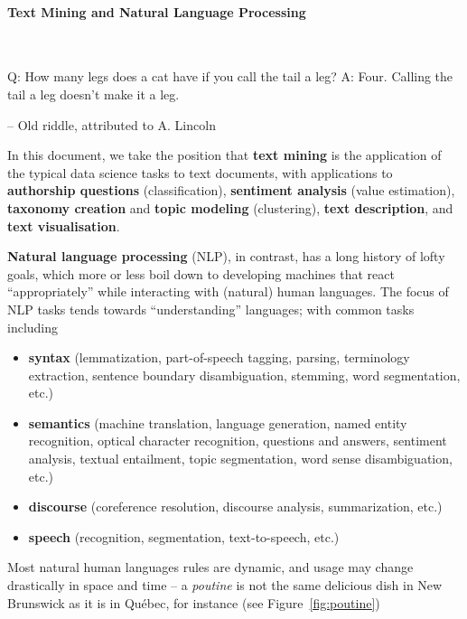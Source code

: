 \paragraph{Text Mining and Natural Language Processing}\ \newline
\begin{tcolorbox}[title=Language and Data]
Q: How many legs does a cat have if you call the tail a leg?\newline
A: Four. Calling the tail a leg doesn't make it a leg.
 \\[-0.6cm]
\begin{flushright}
-- Old riddle, attributed to A. Lincoln
\end{flushright}
\end{tcolorbox}
\noindent In this document, we take the position that \textbf{text mining} is the application of the typical data science tasks to text documents, with applications to \textbf{authorship questions} (classification), \textbf{sentiment analysis} (value estimation), \textbf{taxonomy creation} and \textbf{topic modeling} (clustering), \textbf{text description}, and \textbf{text visualisation}. \par \textbf{Natural language processing} (NLP), in contrast, has a long history of lofty goals, which more or less boil down to developing machines that react ``appropriately'' while interacting with (natural) human languages. The focus of NLP tasks tends towards ``understanding'' languages; with common tasks including 
\begin{itemize}[noitemsep]
    \item \textbf{syntax} (lemmatization, part-of-speech tagging, parsing, terminology extraction, sentence boundary disambiguation, stemming, word segmentation, etc.)
    \item \textbf{semantics} (machine translation, language generation, named entity recognition, optical character recognition, questions and answers, sentiment analysis, textual entailment, topic segmentation, word sense disambiguation, etc.)
    \item \textbf{discourse} (coreference resolution, discourse analysis, summarization, etc.)
    \item \textbf{speech} (recognition, segmentation, text-to-speech, etc.) \cite{TM_NLP_W}
\end{itemize}
Most natural human languages rules are dynamic, and usage may change drastically in space and time -- a \textit{poutine} is not the same delicious dish in New Brunswick as it is in Qu\'ebec, for instance (see Figure~\ref{fig:poutine})
